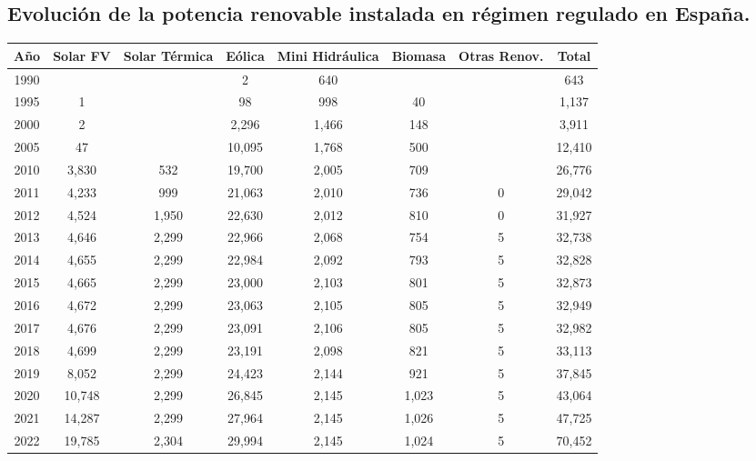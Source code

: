 		\subsection{Evolución de la potencia renovable instalada en régimen regulado en España.}
			\begin{table}[htbp]
				\centering
				\begin{tabular}{cccccccc}
					\toprule
			        Año & Solar FV & Solar Térmica & Eólica & Mini Hidráulica & Biomasa & Otras Renov. & Total \\
					\midrule
					1990 & & & 2 & 640 & & & 643 \\
					1995 & 1 & & 98 & 998 & 40 & & 1,137 \\
					2000 & 2 & & 2,296 & 1,466 & 148 & & 3,911 \\
					2005 & 47 & & 10,095 & 1,768 & 500 & & 12,410 \\
					2010 & 3,830 & 532 & 19,700 & 2,005 & 709 & & 26,776 \\
					2011 & 4,233 & 999 & 21,063 & 2,010 & 736 & 0 & 29,042 \\
					2012 & 4,524 & 1,950 & 22,630 & 2,012 & 810 & 0 & 31,927 \\
					2013 & 4,646 & 2,299 & 22,966 & 2,068 & 754 & 5 & 32,738 \\
					2014 & 4,655 & 2,299 & 22,984 & 2,092 & 793 & 5 & 32,828 \\
					2015 & 4,665 & 2,299 & 23,000 & 2,103 & 801 & 5 & 32,873 \\
					2016 & 4,672 & 2,299 & 23,063 & 2,105 & 805 & 5 & 32,949 \\
					2017 & 4,676 & 2,299 & 23,091 & 2,106 & 805 & 5 & 32,982 \\
					2018 & 4,699 & 2,299 & 23,191 & 2,098 & 821 & 5 & 33,113 \\
					2019 & 8,052 & 2,299 & 24,423 & 2,144 & 921 & 5 & 37,845 \\
					2020 & 10,748 & 2,299 & 26,845 & 2,145 & 1,023 & 5 & 43,064 \\
					2021 & 14,287 & 2,299 & 27,964 & 2,145 & 1,026 & 5 & 47,725 \\
					2022 & 19,785 & 2,304 & 29,994 & 2,145 & 1,024 & 5 & 70,452 \\
				\end{tabular}
			\end{table}

